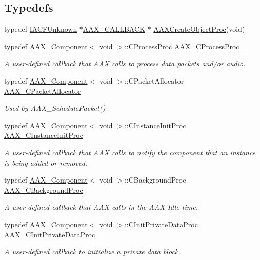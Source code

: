 \subsection*{Typedefs}
\begin{DoxyCompactItemize}
\item 
typedef \mbox{\hyperlink{a01409}{I\+A\+C\+F\+Unknown}} $\ast$\mbox{\hyperlink{a00392_aaa22112139aa627574b1ef562f579d43}{A\+A\+X\+\_\+\+C\+A\+L\+L\+B\+A\+CK}} $\ast$ \mbox{\hyperlink{a00401_ad02e57363d002e60ca822c728896a3c4}{A\+A\+X\+Create\+Object\+Proc}}(void)
\item 
typedef \mbox{\hyperlink{a01437}{A\+A\+X\+\_\+\+Component}}$<$ void $>$\+::C\+Process\+Proc \mbox{\hyperlink{a00401_ad6dd5e1aa5bd2f8462966685e3b26a6e}{A\+A\+X\+\_\+\+C\+Process\+Proc}}
\begin{DoxyCompactList}\small\item\em A user-\/defined callback that A\+AX calls to process data packets and/or audio. \end{DoxyCompactList}\item 
typedef \mbox{\hyperlink{a01437}{A\+A\+X\+\_\+\+Component}}$<$ void $>$\+::C\+Packet\+Allocator \mbox{\hyperlink{a00401_a5c9c7cdc36d5459fa77e5dedb06d161a}{A\+A\+X\+\_\+\+C\+Packet\+Allocator}}
\begin{DoxyCompactList}\small\item\em Used by A\+A\+X\+\_\+\+Schedule\+Packet() \end{DoxyCompactList}\item 
typedef \mbox{\hyperlink{a01437}{A\+A\+X\+\_\+\+Component}}$<$ void $>$\+::C\+Instance\+Init\+Proc \mbox{\hyperlink{a00401_a3963a850079d3186e08c97a1a4d0ef1c}{A\+A\+X\+\_\+\+C\+Instance\+Init\+Proc}}
\begin{DoxyCompactList}\small\item\em A user-\/defined callback that A\+AX calls to notify the component that an instance is being added or removed. \end{DoxyCompactList}\item 
typedef \mbox{\hyperlink{a01437}{A\+A\+X\+\_\+\+Component}}$<$ void $>$\+::C\+Background\+Proc \mbox{\hyperlink{a00401_aa64561d963284a3124a0821e7dc79c9a}{A\+A\+X\+\_\+\+C\+Background\+Proc}}
\begin{DoxyCompactList}\small\item\em A user-\/defined callback that A\+AX calls in the A\+AX Idle time. \end{DoxyCompactList}\item 
typedef \mbox{\hyperlink{a01437}{A\+A\+X\+\_\+\+Component}}$<$ void $>$\+::C\+Init\+Private\+Data\+Proc \mbox{\hyperlink{a00401_adfb5d89b9d957c541fc98fe42bc050c4}{A\+A\+X\+\_\+\+C\+Init\+Private\+Data\+Proc}}
\begin{DoxyCompactList}\small\item\em A user-\/defined callback to initialize a private data block. \end{DoxyCompactList}\end{DoxyCompactItemize}

